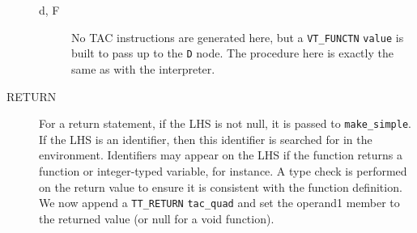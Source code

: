 \begin{description}
\begin{description}
			\item[d, F] No TAC instructions are generated here, but a \verb!VT_FUNCTN! \verb!value! is built to pass up to the \verb!D! node. The procedure here is exactly the same as with the interpreter.
		\end{description}
	\item[RETURN] For a return statement, if the LHS is not null, it is passed to \verb!make_simple!. If the LHS is an identifier, then this identifier is searched for in the environment. Identifiers may appear on the LHS if the function returns a function or integer-typed variable, for instance. A type check is performed on the return value to ensure it is consistent with the function definition. We now append a \verb!TT_RETURN! \verb!tac_quad! and set the operand1 member to the returned value (or null for a void function).
\end{description}

